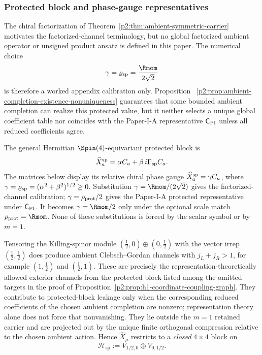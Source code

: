 \documentclass[11pt,a4paper]{article}
\begin{document}
\subsubsection{Protected block and phase-gauge representatives}
\label{p2:app:X_spinor_block}

\begin{remark}
\label{p2:rem:factorized-channel-calibration-status}
The chiral factorization of
Theorem~\ref{p2:thm:ambient-symmetric-carrier} motivates the
factorized-channel terminology, but no global factorized ambient operator or
unsigned product ansatz is defined in this paper.  The numerical choice
\[
\gamma=\varrho_{\rm sp}=\frac{\Rmom}{2\sqrt2}
\]
is therefore a worked appendix calibration only.  Proposition~
\ref{p2:prop:ambient-completion-existence-nonuniqueness} guarantees that some
bounded ambient completion can realize this protected value, but it neither
selects a unique global coefficient table nor coincides with the Paper-I-A
representative \(\mathsf C_{\rm PI}\) unless all reduced coefficients agree.
\end{remark}

The general Hermitian \(\Spin(4)\)-equivariant protected block is
\[
\widehat X_a^{\rm sp}
=\alpha C_a+\beta\,i\Gamma_{\rm sp}C_a.
\]
The matrices below display its relative chiral phase gauge
\(\widehat X_a^{\rm sp}=\gamma C_a\), where
\(\gamma=\varrho_{\rm sp}=(\alpha^2+\beta^2)^{1/2}\ge0\).  Substitution
\(\gamma=\Rmom/(2\sqrt2)\) gives the factorized-channel
calibration; \(\gamma=\rho_{\rm prot}/2\) gives the Paper-I-A protected
representative under \(\mathsf C_{\rm PI}\).  It becomes
\(\gamma=\Rmom/2\) only under the optional scale match
\(\rho_{\rm prot}=\Rmom\).  None of these substitutions is forced by the
scalar symbol or by \(m=1\).

Tensoring the Killing-spinor module
$(\tfrac12,0)\oplus (0,\tfrac12)$ with the vector irrep $(\tfrac12,\tfrac12)$ does produce ambient Clebsch--Gordan channels with $j_L+j_R>1$, for example $(1,\tfrac12)$ and $(\tfrac12,1)$.
These are precisely the representation-theoretically allowed exterior
channels from the protected block listed among the omitted targets in the
proof of Proposition~\ref{p2:prop:h1-coordinate-coupling-graph}.  They
contribute to protected-block leakage only when the corresponding reduced
coefficients of the chosen ambient completion are nonzero; representation
theory alone does not force that nonvanishing.  They lie outside the \(m=1\)
retained carrier and are projected out by the unique finite orthogonal
compression relative to the chosen ambient action.  Hence \(\hat X_\mu\)
restricts to a \emph{closed} \(4\times 4\) block on
\[
\mathcal{H}_{\mathrm{sp}}:=V_{1/2,0}\oplus V_{0,1/2}.
\]
\end{document}
